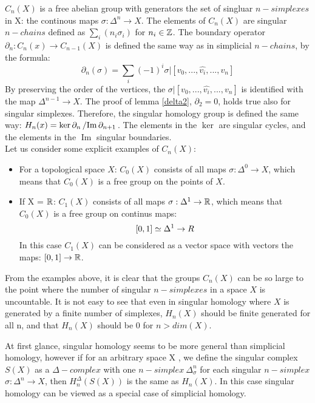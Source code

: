 \documentclass[11pt,a4paper]{report}
\DeclareMathOperator{\Ima}{Im}
\begin{document}
     $C_n(X)$ is a free abelian group with generators the set of singluar $n-simplexes$ in X: the continous maps $\sigma: \Delta^n \rightarrow X$. The elements of $C_n(X)$ are singular $n-chains$ defined as $\sum_i(n_i\sigma_i)$ for $n_i \in \mathbb{Z}$. The boundary operator $\partial_n: C_n(x) \rightarrow C_{n-1}(X)$ is defined the same way as in simplicial $n-chains$, by the formula: 
     \[
		         \partial_n(\sigma) = \sum\limits_i (-1)^i \sigma | [v_0, ... ,\hat{v_i}, ... , v_n]
              \] 
     By preserving the order of the vertices, the $\sigma |[v_0, ... ,\hat{v_i}, ... , v_n]$ is identified with the map $\Delta^{n-1} \rightarrow X$. The proof of lemma \ref{delta2}, $\partial_2 = 0$, holds true also for singular simplexes. Therefore, the singular homology group is defined the same way: $H_n(x) = \ker\partial_n \left/ \Ima \partial_{n+1} \right.$. The elements in the $\ker$ are singular cycles, and the elements in the $\Ima$ singular boundaries. \\
     
      Let us consider some explicit examples of $C_n(X)$: 
      \begin{itemize}
       \item 
      For a topological space $X$: 
      $C_0(X)$ consists of all maps $\sigma: \Delta^0 \rightarrow X$, which means that $C_0(X)$ is a free group on the points of $X$.
      \item
      If X = $\mathbb{R}$: $C_1(X)$ consists of all maps $\sigma: \Delta^1 \rightarrow \mathbb{R}$, which means that $C_0(X)$ is a free group on continus maps:
      \[
        [0, 1] \simeq \Delta^1 \rightarrow \\R
      \]
      In this case $C_1(X)$ can be considered as a vector space with vectors the maps: $[0, 1] \rightarrow \mathbb{R}$.
      \end{itemize}
      
    From the examples above, it is clear that the groups $C_n(X)$ can be so large to the point where the number of singular $n-simplexes$ in a space $X$ is uncountable. It is not easy to see that even in singular homology where $X$ is generated by a finite number of simplexes, $H_n(X)$ should be finite generated for all n, and that $H_n(X)$ should be 0 for $n > dim(X)$. 
    
    At first glance, singular homology seems to be more general than simplicial homology, however if for an arbitrary space X , we define the singular complex $S(X)$ as a $\Delta-complex$ with one $n-simplex \ \Delta_\sigma^n$ for each singular $n-simplex$ $\sigma: \Delta^n \rightarrow X$, then $H_n^\Delta(S(X))$ is the same as $H_n(X)$. In this case singular homology can be viewed as a special case of simplicial homology.
    
\end{document}
